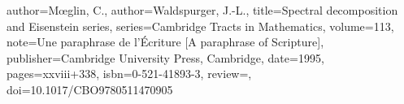 \documentclass[11pt]{amsart}
\theoremstyle{remark}
\begin{document}
\begin{bibdiv}
\begin{biblist}
%    
%	
%    
    {
       author={M{\oe}glin, C.},
       author={Waldspurger, J.-L.},
       title={Spectral decomposition and Eisenstein series},
       series={Cambridge Tracts in Mathematics},
       volume={113},
       note={Une paraphrase de l'\'Ecriture [A paraphrase of Scripture]},
       publisher={Cambridge University Press, Cambridge},
       date={1995},
       pages={xxviii+338},
       isbn={0-521-41893-3},
       review={},
       doi={10.1017/CBO9780511470905}
    }
    

\end{biblist}
\end{bibdiv}
\end{document}

